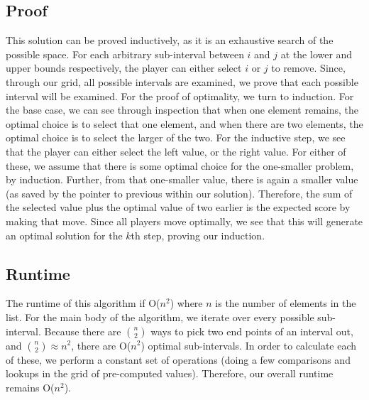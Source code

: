 \documentclass[titlepage]{article}
\numberwithin{equation}{subsection}
\begin{document}
\subsection{Proof}
This solution can be proved inductively, as it is an exhaustive search of the possible space. For each arbitrary sub-interval between $i$ and $j$
at the lower and upper bounds respectively, the player can either select $i$ or $j$ to remove. Since, through our grid, all possible intervals
are examined, we prove that each possible interval will be examined. For the proof of optimality, we turn to induction. For the base case,
we can see through inspection that when one element remains, the optimal choice is to select that one element, and when there are two elements,
the optimal choice is to select the larger of the two. For the inductive step, we see that the player can either select the left value, or 
the right value. For either of these, we assume that there is some optimal choice for the one-smaller problem, by induction. Further, from
that one-smaller value, there is again a smaller value (as saved by the pointer to previous within our solution). Therefore, the sum of
the selected value plus the optimal value of two earlier is the expected score by making that move. Since all players move optimally, we
see that this will generate an optimal solution for the $k$th step, proving our induction.
\subsection{Runtime}
The runtime of this algorithm if O($n^2$) where $n$ is the number of elements in the list. For the main body of the algorithm, we iterate 
over every possible sub-interval. Because there are $n\choose 2$ ways to pick two end points of an interval out, and 
${n \choose 2} \approx n^2$, there are O($n^2$) optimal sub-intervals. In order to calculate each of these, we perform a constant set of 
operations (doing a few comparisons and lookups in the grid of pre-computed values). Therefore, our overall runtime remains O($n^2$).
\end{document}
